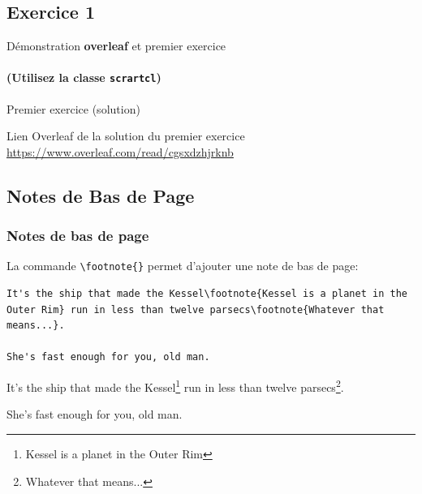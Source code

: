 \subsection{Exercice 1}

\begin{frame}[fragile]{Démonstration \textbf{overleaf} et premier exercice}
  \framesubtitle{(Utilisez la classe \texttt{scrartcl})}
  \begin{center}
  \end{center}
\end{frame}

\begin{frame}[fragile]{Premier exercice (solution)}
  \begin{center}
  Lien Overleaf de la solution du premier exercice \url{https://www.overleaf.com/read/cgsxdzhjrknb}
  \end{center}
\end{frame}

\subsection{Notes de Bas de Page}

\begin{frame}[fragile]
  \frametitle{Notes de bas de page}
  La commande \lstinline|\footnote{}| permet d'ajouter une note de bas de page:
  \begin{lstlisting}[style=nonumbers]
It's the ship that made the Kessel\footnote{Kessel is a planet in the Outer Rim} run in less than twelve parsecs\footnote{Whatever that means...}.

She's fast enough for you, old man.
  \end{lstlisting}
  \begin{minipage}{\textwidth}
    It's the ship that made the Kessel\footnote{Kessel is a planet in the Outer Rim} run in less than twelve parsecs\footnote{Whatever that means...}.

    She's fast enough for you, old man.
  \end{minipage}
\end{frame}

